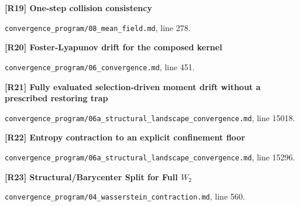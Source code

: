 \documentclass[11pt,a4paper]{article}
\begin{document}
\par\medskip\noindent\begin{minipage}{\linewidth}\textbf{[R19] One-step collision consistency}\label{src:thm-mean-field-one-step-consistency}\par
{\small\texttt{}\par
\nolinkurl{convergence_program/08_mean_field.md}, line 278.\par}
\end{minipage}\par

\par\medskip\noindent\begin{minipage}{\linewidth}\textbf{[R20] Foster-Lyapunov drift for the composed kernel}\label{src:thm-foster-lyapunov-main}\par
{\small\texttt{}\par
\nolinkurl{convergence_program/06_convergence.md}, line 451.\par}
\end{minipage}\par

\par\medskip\noindent\begin{minipage}{\linewidth}\textbf{[R21] Fully evaluated selection-driven moment drift without a prescribed restoring trap}\label{src:thm-slceg-full-moment}\par
{\small\texttt{}\par
\nolinkurl{convergence_program/06a_structural_landscape_convergence.md}, line 15018.\par}
\end{minipage}\par

\par\medskip\noindent\begin{minipage}{\linewidth}\textbf{[R22] Entropy contraction to an explicit confinement floor}\label{src:thm-slce-entropy-floor}\par
{\small\texttt{}\par
\nolinkurl{convergence_program/06a_structural_landscape_convergence.md}, line 15296.\par}
\end{minipage}\par

\par\medskip\noindent\begin{minipage}{\linewidth}\textbf{[R23] Structural/Barycenter Split for Full \(W_2\)}\label{src:thm-full-w2-split}\par
{\small\texttt{}\par
\nolinkurl{convergence_program/04_wasserstein_contraction.md}, line 560.\par}
\end{minipage}\par
\end{document}
